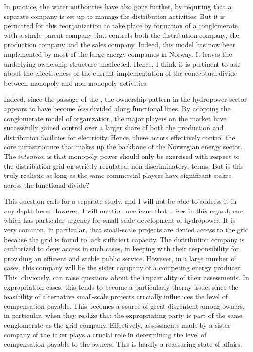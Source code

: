In practice, the water authorities have also gone further, by requiring that a separate company is set up to manage the distribution activities. But it is permitted for this reorganization to take place by formation of a conglomerate, with a single parent company that controls both the distribution company, the production company and the sales company. Indeed, this model has now been implemented by most of the large energy companies in Norway. It leaves the underlying ownership-structure unaffected. Hence, I think it is pertinent to ask about the effectiveness of the current implementation of the conceptual divide between monopoly and non-monopoly activities. 

Indeed, since the passage of the \cite{ea90}, the ownership pattern in the hydropower sector appears to have become {\it less} divided along functional lines. By adopting the conglomerate model of organization, the major players on the market have successfully gained control over a larger share of both the production and distribution facilities for electricity. Hence, these actors effectively control the core infrastructure that makes up the backbone of the Norwegian energy sector. The {\it intention} is that monopoly power should only be exercised with respect to the distribution grid on strictly regulated, non-discriminatory, terms. But is this truly realistic as long as the same commercial players have significant stakes across the functional divide?

This question calls for a separate study, and I will not be able to address it in any depth here. However, I will mention one issue that arises in this regard, one which has particular urgency for small-scale development of hydropower. It is very common, in particular, that small-scale projects are denied access to the grid because the grid is found to lack sufficient capacity. The distribution  company is authorized to deny access in such cases, in keeping with their responsibility for providing an efficient and stable public service. However, in a large number of cases, this company will be the sister company of a competing energy producer. This, obviously, can raise questions about the impartiality of their assessments. In expropriation cases, this tends to become a particularly thorny issue, since the feasibility of alternative small-scale projects crucially influences the level of compensation payable. This becomes a source of great discontent among owners, in particular, when they realize that the expropriating party is part of the same conglomerate as the grid company. Effectively, assessments made by a sister company of the taker plays a crucial role in determining the level of compensation payable to the owners. This is hardly a reassuring state of affairs.

